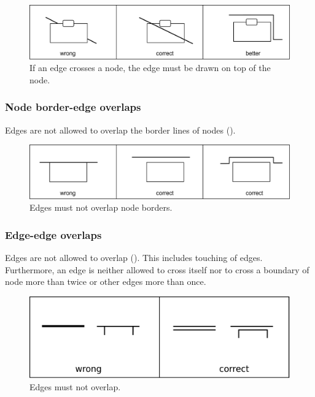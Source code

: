 \begin{figure}[h!]
  \centering
  \includegraphics[scale=0.4]{images/layout-node-edge}
  \caption{If an edge crosses a node, the edge must be drawn on top  of the node.}\label{fig:af:layout2}
\end{figure}

\subsubsection{Node border-edge overlaps}

Edges are not allowed to overlap the border lines of nodes ().

\begin{figure}[h!]
  \centering
  \includegraphics[scale=0.4]{images/layout-node-border-edge}
  \caption{Edges must not overlap node borders.}\label{fig:af:layout3}
\end{figure}

\subsubsection{Edge-edge overlaps}

Edges are not allowed to overlap (). This includes touching of edges. Furthermore, an edge is neither allowed to cross itself nor to cross
a boundary of node more than twice or other edges more than once.

\begin{figure}[h!]
  \centering
  \includegraphics[scale=0.4]{images/layout-edge-edge}
  \caption{Edges must not overlap.}\label{fig:af:layout4}
\end{figure}

